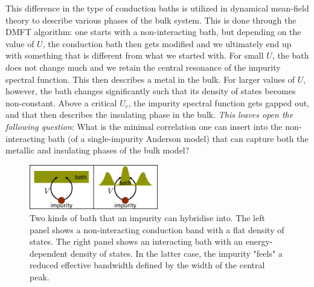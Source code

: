 \documentclass[reprint,superscriptaddress,floatfix]{revtex4-2}
\begin{document}
This difference in the type of conduction baths is utilized in dynamical mean-field theory to describe various phases of the bulk system.
This is done through the DMFT algorithm: one starts with a non-interacting bath, but depending on the value of \(U\), the conduction bath then gets modified and we ultimately end up with something that is different from what we started with.
For small \(U\), the bath does not change much and we retain the central resonance of the impurity spectral function.
This then describes a metal in the bulk.
For larger values of \(U\), however, the bath changes significantly such that its density of states becomes non-constant.
Above a critical \(U_c\), the impurity spectral function gets gapped out, and that then describes the insulating phase in the bulk.
\textit{This leaves open the following question}: What is the minimal correlation one can insert into the non-interacting bath (of a single-impurity Anderson model) that can capture both the metallic and insulating phases of the bulk model?

\begin{figure}[!htb]
\centering
\includegraphics[width=0.5\textwidth]{dos_diff.pdf}
\caption{Two kinds of bath that an impurity can hybridise into. The left panel shows a non-interacting conduction band with a flat density of states. The right panel shows an interacting bath with an energy-dependent density of states. In the latter case, the impurity "feels" a reduced effective bandwidth defined by the width of the central peak.}
\end{figure}
\end{document}
